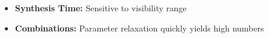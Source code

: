 \begin{frame}{}
\vspace{0.15cm}
\begin{itemize}\setlength\itemsep{0.2cm}
    \item<1-> \textbf{Synthesis Time:} Sensitive to visibility range
    \item<2-> \textbf{Combinations:} Parameter relaxation quickly yields high numbers
\end{itemize}

\vfill


\end{frame}
